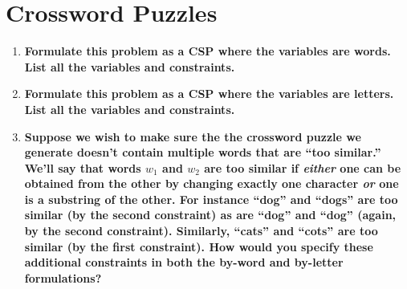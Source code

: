 \documentclass[11pt, letterpaper]{hw}
\begin{document}
\section{Crossword Puzzles}
\begin{enumerate}
\item \textbf{Formulate this problem as a CSP where the variables are words. List all the variables and constraints.}
\item \textbf{Formulate this problem as a CSP where the variables are letters. List all the variables and constraints.}
\item \textbf{Suppose we wish to make sure the the crossword puzzle we generate
doesn't contain multiple words that are ``too similar.''  We'll say
that words $w_1$ and $w_2$ are too similar if \emph{either} one can be
obtained from the other by changing exactly one character \emph{or}
one is a substring of the other.  For instance ``dog'' and ``dogs''
are too similar (by the second constraint) as are ``dog'' and ``dog''
(again, by the second constraint).  Similarly, ``cats'' and ``cots''
are too similar (by the first constraint).  How would you specify
these additional constraints in both the by-word and by-letter
formulations?}
\end{enumerate}
\end{document}
